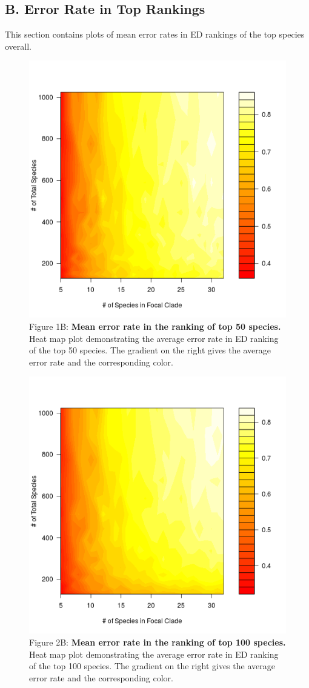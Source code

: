 \documentclass[10pt,english]{article}
\begin{document}
\clearpage
\subsection*{B. Error Rate in Top Rankings}

This section contains plots of mean error rates in ED rankings of the top
species overall. 

\begin{figure}[!ht]
  \center
  \includegraphics[width=.5\textwidth]{errorRate50.png}
  \caption*{Figure 1B: \textbf{Mean error rate in the ranking of top 50 species.} Heat map
  plot demonstrating the average error rate in ED ranking of the top 50 species.
  The gradient on the right gives the average error rate and the corresponding
  color.}
\end{figure}

\begin{figure}[!ht]
  \center
  \includegraphics[width=.5\textwidth]{errorRate100.png}
  \caption*{Figure 2B: \textbf{Mean error rate in the ranking of top 100 species.} Heat map
  plot demonstrating the average error rate in ED ranking of the top 100 species.
  The gradient on the right gives the average error rate and the corresponding
  color.}
\end{figure}
\end{document}
